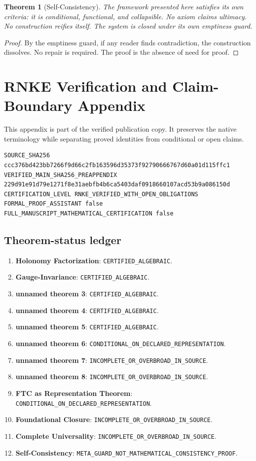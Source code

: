 \documentclass[12pt, oneside]{article}
\newtheorem{theorem}{Theorem}[section]
\begin{document}
\begin{theorem}[Self-Consistency]
The framework presented here satisfies its own criteria: it is conditional, functional, and collapsible. No axiom claims ultimacy. No construction reifies itself. The system is closed under its own emptiness guard.
\end{theorem}

\begin{proof}
By the emptiness guard, if any reader finds contradiction, the construction dissolves. No repair is required. The proof is the absence of need for proof.
\end{proof}

\clearpage
\section{RNKE Verification and Claim-Boundary Appendix}
This appendix is part of the verified publication copy. It preserves the native terminology while separating proved identities from conditional or open claims.
\begin{verbatim}
SOURCE_SHA256 ccc376bd423bb7266f9d66c2fb163596d35373f92790666767d60a01d115ffc1
VERIFIED_MAIN_SHA256_PREAPPENDIX 229d91e91d79e1271f8e31aebfb4b6ca5403daf0918660107acd53b9a086150d
CERTIFICATION_LEVEL RNKE_VERIFIED_WITH_OPEN_OBLIGATIONS
FORMAL_PROOF_ASSISTANT false
FULL_MANUSCRIPT_MATHEMATICAL_CERTIFICATION false
\end{verbatim}
\subsection{Theorem-status ledger}
\begin{enumerate}
\item \textbf{Holonomy Factorization}: \texttt{CERTIFIED\_ALGEBRAIC}.
\item \textbf{Gauge-Invariance}: \texttt{CERTIFIED\_ALGEBRAIC}.
\item \textbf{unnamed theorem 3}: \texttt{CERTIFIED\_ALGEBRAIC}.
\item \textbf{unnamed theorem 4}: \texttt{CERTIFIED\_ALGEBRAIC}.
\item \textbf{unnamed theorem 5}: \texttt{CERTIFIED\_ALGEBRAIC}.
\item \textbf{unnamed theorem 6}: \texttt{CONDITIONAL\_ON\_DECLARED\_REPRESENTATION}.
\item \textbf{unnamed theorem 7}: \texttt{INCOMPLETE\_OR\_OVERBROAD\_IN\_SOURCE}.
\item \textbf{unnamed theorem 8}: \texttt{INCOMPLETE\_OR\_OVERBROAD\_IN\_SOURCE}.
\item \textbf{FTC as Representation Theorem}: \texttt{CONDITIONAL\_ON\_DECLARED\_REPRESENTATION}.
\item \textbf{Foundational Closure}: \texttt{INCOMPLETE\_OR\_OVERBROAD\_IN\_SOURCE}.
\item \textbf{Complete Universality}: \texttt{INCOMPLETE\_OR\_OVERBROAD\_IN\_SOURCE}.
\item \textbf{Self-Consistency}: \texttt{META\_GUARD\_NOT\_MATHEMATICAL\_CONSISTENCY\_PROOF}.
\end{enumerate}
\end{document}
